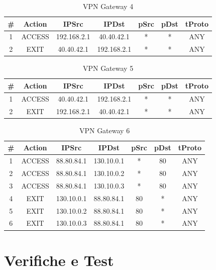 \begin{table}[H]
    \centering
    \begin{tabular}{ccccccc}
        \hline
         \# & Action & IPSrc & IPDst & pSrc & pDst & tProto \\
        \hline
        1 & ACCESS & 192.168.2.1 & 40.40.42.1 & * & * & ANY \\
        2 & EXIT & 40.40.42.1 & 192.168.2.1 & * & * & ANY \\
        \hline
    \end{tabular}
    \caption{VPN Gateway 4}
    \label{tab:VPN Gateway 4}
\end{table}

\begin{table}[H]
    \centering
    \begin{tabular}{ccccccc}
        \hline
         \# & Action & IPSrc & IPDst & pSrc & pDst & tProto \\
        \hline
        1 & ACCESS & 40.40.42.1 & 192.168.2.1 & * & * & ANY \\
        2 & EXIT & 192.168.2.1 & 40.40.42.1 & * & * & ANY \\
        \hline
    \end{tabular}
    \caption{VPN Gateway 5}
    \label{tab:VPN Gateway 5}
\end{table}

\begin{table}[H]
    \centering
    \begin{tabular}{ccccccc}
        \hline
         \# & Action & IPSrc & IPDst & pSrc & pDst & tProto \\
        \hline
        1 & ACCESS & 88.80.84.1 & 130.10.0.1 & * & 80 & ANY \\
        2 & ACCESS & 88.80.84.1 & 130.10.0.2 & * & 80 & ANY \\
        3 & ACCESS & 88.80.84.1 & 130.10.0.3 & * & 80 & ANY \\
        4 & EXIT & 130.10.0.1 & 88.80.84.1 & 80 & * & ANY \\
        5 & EXIT & 130.10.0.2 & 88.80.84.1 & 80 & * & ANY \\
        6 & EXIT & 130.10.0.3 & 88.80.84.1 & 80 & * & ANY \\
        \hline
    \end{tabular}
    \caption{VPN Gateway 6}
    \label{tab:VPN Gateway 6}
\end{table}

\section{Verifiche e Test}